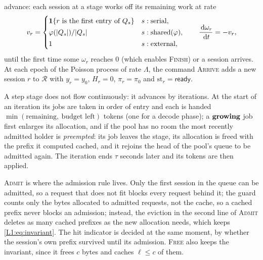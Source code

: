 \begin{definition}
advance: each session at a stage works off its remaining work at rate
\begin{equation}\label{L1:eq:rates}
  v_r=\begin{cases}
    \mathbf{1}\{r \text{ is the first entry of } Q_s\} & s:\mathrm{serial},\\[0.2em]
    \varphi(|Q_s|)/|Q_s| & s:\mathrm{shared}(\varphi),\\[0.2em]
    1 & s:\mathrm{external},
  \end{cases}
  \qquad \frac{\,\mathrm{d}\omega_r}{\,\mathrm{d} t}=-v_r,
\end{equation}
until the first time some $\omega_r$ reaches $0$ (which enables \textsc{Finish}) or a
session arrives. At each epoch of the Poisson process of rate $\Lambda$, the command
\textsc{Arrive} adds a new session $r$ to $\mathcal R$ with $y_r=y_0$, $H_r=0$,
$\pi_r=\pi_0$ and $\mathrm{st}_r=\mathsf{ready}$.
\end{definition}

A step stage does not flow continuously: it advances by iterations. At
the start of an iteration its jobs are taken in order of entry and each is
handed $\min(\text{remaining},\ \text{budget left})$ tokens (one for a decode
phase); a $\mathbf{growing}$ job first enlarges its allocation, and if the pool
has no room the most recently admitted holder is \emph{preempted}: its job
leaves the stage, its allocation is freed with the prefix it computed
cached, and it rejoins the head of the pool's queue to be admitted again.
The iteration ends $\tau$ seconds later and its tokens are then applied.

\textsc{Admit} is where the admission rule lives. Only the first session in the queue
can be admitted, so a request that does not fit blocks every request behind it; the
guard counts only the bytes allocated to admitted requests, not the cache, so a cached
prefix never blocks an admission; instead, the eviction in the second line of
\textsc{Admit} deletes as many cached prefixes as the new allocation needs, which keeps
\eqref{L1:eq:invariant}. The hit indicator is decided at the same moment, by whether
the session's own prefix survived until its admission. \textsc{Free} also keeps the
invariant, since it frees $c$ bytes and caches $\ell\le c$ of them.

